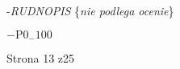 \documentclass[a4paper,12pt]{article}
\begin{document}
-{\it RUDNOPIS} \{{\it nie podlega ocenie}\}

$-\mathrm{P}0_{-}100$

Strona 13 z25
\end{document}
